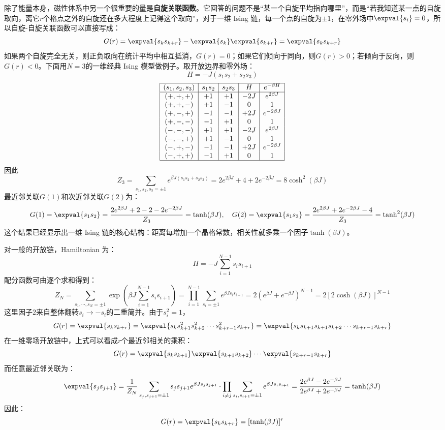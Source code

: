 除了能量本身，磁性体系中另一个很重要的量是\textbf{自旋关联函数}。它回答的问题不是“某一个自旋平均指向哪里”，而是“若我知道某一点的自旋取向，离它$r$个格点之外的自旋还在多大程度上记得这个取向”，对于一维 Ising 链，每一个点的自旋为$\pm1$，在零外场中$\expval{s_i}=0$，所以自旋-自旋关联函数可以直接写成：
\[G(r)=\expval{s_ks_{k+r}}-\expval{s_k}\expval{s_{k+r}}=\expval{s_ks_{k+r}}\]
如果两个自旋完全无关，则正负取向在统计平均中相互抵消，$G(r)=0$；如果它们倾向于同向，则$G(r)>0$；若倾向于反向，则$G(r)<0$。下面用$N=3$的一维经典 Ising 模型做例子。取开放边界和零外场：
\[H=-J(s_1s_2+s_2s_3)\]
\[
\begin{array}{|c|c|c|c|c|}
\hline
(s_1,s_2,s_3) & s_1s_2 & s_2s_3 & H & e^{-\beta H} \\ \hline
(+,+,+) & +1 & +1 & -2J & e^{2\beta J} \\
(+,+,-) & +1 & -1 & 0 & 1 \\
(+,-,+) & -1 & -1 & +2J & e^{-2\beta J} \\
(+,-,-) & -1 & +1 & 0 & 1 \\
(-,-,-) & +1 & +1 & -2J & e^{2\beta J} \\
(-,-,+) & +1 & -1 & 0 & 1 \\
(-,+,-) & -1 & -1 & +2J & e^{-2\beta J} \\
(-,+,+) & -1 & +1 & 0 & 1\\\hline
\end{array}
\]
因此
\[Z_3=\sum_{s_1,s_2,s_3=\pm1}e^{\beta J(s_1s_2+s_2s_3)}=2e^{2\beta J}+4+2e^{-2\beta J}=8\cosh^2(\beta J)\]
最近邻关联$G(1)$和次近邻关联$G(2)$为：
\[G(1)=\expval{s_1s_2}=\frac{2e^{2\beta J}+2-2-2e^{-2\beta J}}{Z_3}=\tanh(\beta J), \quad G(2)=\expval{s_1s_3}=\frac{2e^{2\beta J}+2e^{-2\beta J}-4}{Z_3}=\tanh^2(\beta J)\]
这个结果已经显示出一维 Ising 链的核心结构：距离每增加一个晶格常数，相关性就多乘一个因子$\tanh(\beta J)$。

对一般的开放链，Hamiltonian 为：
\[H=-J\sum_{i=1}^{N-1}s_is_{i+1}\]
配分函数可由逐个求和得到：
\[Z_N=\sum_{s_1,\cdots,s_N=\pm1}\exp\left(\beta J\sum_{i=1}^{N-1}s_is_{i+1}\right)=\prod_{i=1}^{N-1}\sum_{s_i=\pm1}e^{\beta Js_i s_{i+1}}=2(e^{\beta J}+e^{-\beta J})^{N-1}=2[2\cosh(\beta J)]^{N-1}\]
这里因子$2$来自整体翻转$s_i\to -s_i$的二重简并。由于$s_i^2=1$，
\[G(r)=\expval{s_ks_{k+r}}=\expval{s_ks_{k+1}^2s_{k+2}^2\cdots s_{k+r-1}^2s_{k+r}}=\expval{s_ks_{k+1}s_{k+1}s_{k+2}\cdots s_{k+r-1}s_{k+r}}\]
在一维零场开放链中，上式可以看成$r$个最近邻相关的乘积：
\[G(r)=\expval{s_ks_{k+1}}\expval{s_{k+1}s_{k+2}}\cdots\expval{s_{k+r-1}s_{k+r}}\]
而任意最近邻关联为：
\[\expval{s_js_{j+1}}=\frac{1}{Z_N}\sum_{s_j,s_{j+1}=\pm1}s_js_{j+1}e^{\beta Js_js_{j+1}}\cdot\prod_{i\neq j}\sum_{s_i,s_{i+1}=\pm1}e^{\beta Js_is_{i+1}}=\frac{2e^{\beta J}-2e^{-\beta J}}{2e^{\beta J}+2e^{-\beta J}}=\tanh(\beta J)\]
因此：
\[G(r)=\expval{s_ks_{k+r}}=[\tanh(\beta J)]^r\]

